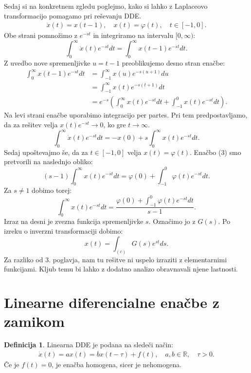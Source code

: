 \documentclass[12pt,a4paper]{amsart}
\theoremstyle{definition} %
\newtheorem{definicija}{Definicija}[section]
\theoremstyle{plain} %
\newcommand{\R}{\mathbb R}
\begin{document}
    Sedaj si na konkretnem zgledu poglejmo, kako si lahko z Laplaceovo transformacijo pomagamo pri reševanju DDE.
    \begin{equation} \label{eq3}
        \begin{split}
            \dot{x}(t)=x(t-1), \quad x(t)=\varphi(t), \quad t\in[-1,0].
        \end{split}
    \end{equation}
    Obe strani pomnožimo z $e^{-st}$ in integriramo na intervalu $[0,\infty)$:
     \[\int_{0}^{\infty}\dot{x}(t)e^{-st}dt = \int_{0}^{\infty}x(t-1)e^{-st}dt.\]
    Z uvedbo nove spremenljivke $u=t-1$ preoblikujemo desno stran enačbe:
    \begin{equation*}
        \begin{split}
            \int_{0}^{\infty}x(t-1)e^{-st}dt &= \int_{-1}^{\infty}x(u)e^{-s(u+1)}du \\
             &= \int_{-1}^{\infty}x(t)e^{-s(t+1)}dt \\
             &= e^{-s}\left(\int_{0}^{\infty}x(t)e^{-st}dt + \int_{-1}^{0}x(t)e^{-st}dt\right). 
        \end{split}      
    \end{equation*}
    Na levi strani enačbe uporabimo integracijo per partes. Pri tem predpostavljamo, da za 
    rešitev velja $x(t)e^{-st} \to 0$, ko gre $t \to\infty$.
    \[\int_{0}^{\infty}\dot{x}(t)e^{-st}dt=-x(0)+s\int_{0}^{\infty}x(t)e^{-st}dt.\]
    Sedaj upoštevajmo še, da za $t\in[-1,0]$ velja $x(t)=\varphi(t)$. Enačbo (3) smo pretvorili na naslednjo obliko:
    \[(s-1)\int_{0}^{\infty}x(t)e^{-st}dt=\varphi(0)+\int_{-1}^0\varphi(t)e^{-st}dt.\]
    Za $s\neq 1$ dobimo torej:
    \[\int_{0}^{\infty}x(t)e^{-st}dt=\frac{\varphi(0)+\int_{-1}^0\varphi(t)e^{-st}dt}{s-1}.\]
    Izraz na desni je zvezna funkcija spremenljivke $s$. Označimo jo z $G(s)$. Po izreku o inverzni
    transformaciji dobimo:
    \[x(t)=\int_{(c)}G(s)e^{st}ds.\]
    Za razliko od 3. poglavja, nam tu rešitve ni uspelo
    izraziti z elementarnimi funkcijami. Kljub temu bi lahko z dodatno analizo obravnavali njene lastnosti.

\section{Linearne diferencialne enačbe z zamikom}

\begin{definicija}
    Linearna DDE je podana na sledeči način:
    \begin{equation} \label{eq4}
        \begin{split}
            \dot{x}(t)=ax(t)=bx(t-\tau)+f(t),\quad a,b\in\R, \quad \tau>0.
        \end{split}
    \end{equation}
    Če je $f(t)=0$, je enačba homogena, sicer je nehomogena. 
\end{definicija}
\end{document}
